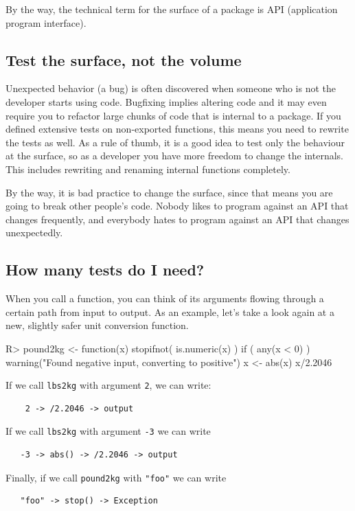 \documentclass[11pt]{article}
\newcommand{\code}[1]{\texttt{#1}}
\begin{document}
By the way, the technical term for the surface of a package is API (application
program interface).




\subsection{Test the surface, not the volume}

Unexpected behavior (a bug) is often discovered when someone who is not the
developer starts using code. Bugfixing implies altering code and it may even
require you to refactor large chunks of code that is internal to a package.  If
you defined extensive tests on non-exported functions, this means you need to
rewrite the tests as well. As a rule of thumb, it is a good idea to test only
the behaviour at the surface, so as a developer you have more freedom to change
the internals. This includes rewriting and renaming internal functions completely.


By the way, it is bad practice to change the surface, since that means you are
going to break other people's code. Nobody likes to program against an API that
changes frequently, and everybody hates to program against an API that changes
unexpectedly.

\subsection{How many tests do I need?}
When you call a function, you can think of its arguments flowing through a
certain path from input to output. As an example, let's take a look again at a
new, slightly safer unit conversion function.
\begin{Schunk}
\begin{Sinput}
R> pound2kg <- function(x){
     stopifnot( is.numeric(x) )
     if ( any(x < 0) ){
       warning("Found negative input, converting to positive")
       x <- abs(x)
     }
     x/2.2046
   }
\end{Sinput}
\end{Schunk}
If we call \code{lbs2kg} with argument \code{2}, we can write:
\begin{verbatim}
    2 -> /2.2046 -> output
\end{verbatim}
If we call \code{lbs2kg} with argument \code{-3} we can write
\begin{verbatim}
   -3 -> abs() -> /2.2046 -> output
\end{verbatim}
Finally, if we call \code{pound2kg} with \code{"foo"} we can write
\begin{verbatim}
   "foo" -> stop() -> Exception
\end{verbatim}
\end{document}
